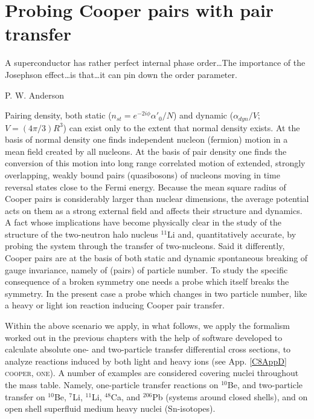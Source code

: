  \chapter{Probing Cooper pairs with pair transfer}\label{C8}
 \epigraph{A superconductor has rather perfect internal phase order\dots The importance of the Josephson effect\dots is that\dots it can pin down the order parameter.}{P. W. Anderson}
Pairing density, both static ($n_{st}=e^{-2i\phi}\alpha'_0/N$) and dynamic ($\alpha_{dyn}/V$;$V=(4\pi/3)R^3$) can exist only to the extent that normal density exists. At the basis of normal density one finds independent nucleon (fermion) motion in a mean field created by all nucleons. At the basis of pair density one finds the conversion of this motion into long range correlated motion of extended, strongly overlapping, weakly bound pairs (quasibosons) of nucleons moving in time reversal states close to the Fermi energy. Because the mean square radius of Cooper pairs is considerably larger than nuclear dimensions, the average potential acts on them as a strong external field and affects their structure and dynamics. A fact whose implications have become physically clear in the study of the structure of the two-neutron halo nucleus $^{11}$Li and, quantitatively accurate, by probing the system through the transfer of two-nucleons. Said it differently, Cooper pairs are at the basis of both static and dynamic spontaneous breaking of gauge invariance, namely of (pairs) of particle number. To study the specific consequence of a broken symmetry one needs a probe which itself breaks the symmetry. In the present case a probe which changes in two particle number, like a heavy or light ion reaction inducing Cooper pair transfer.

Within the above scenario we apply, in   what follows, we apply the formalism worked out in the previous chapters with the help of software developed to calculate absolute one- and two-particle transfer differential cross sections, to analyze reactions induced by both light and heavy ions (see App. \ref{C8AppD} \textsc{cooper}, \textsc{one}).
 A number of examples are considered covering nuclei throughout the mass table. Namely,  one-particle transfer reactions on  $^{10}$Be, and two-particle transfer  on $^{10}$Be,    $^{7}$Li, $^{11}$Li, $^{48}$Ca, and $^{206}$Pb (systems around closed shells), and on open shell superfluid medium heavy nuclei (Sn-isotopes).
